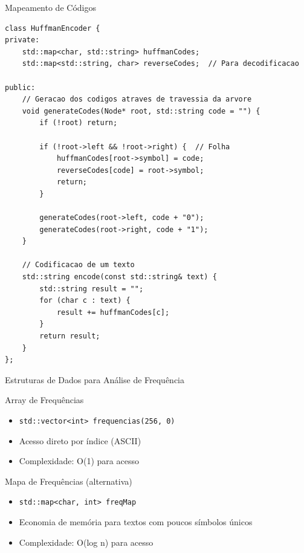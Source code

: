 \documentclass{beamer}
\begin{document}
\begin{frame}[fragile]{Mapeamento de Códigos}
    \begin{lstlisting}[style=CStyle, caption=Armazenamento dos códigos de Huffman]
class HuffmanEncoder {
private:
    std::map<char, std::string> huffmanCodes;
    std::map<std::string, char> reverseCodes;  // Para decodificacao
    
public:
    // Geracao dos codigos atraves de travessia da arvore
    void generateCodes(Node* root, std::string code = "") {
        if (!root) return;
        
        if (!root->left && !root->right) {  // Folha
            huffmanCodes[root->symbol] = code;
            reverseCodes[code] = root->symbol;
            return;
        }
        
        generateCodes(root->left, code + "0");
        generateCodes(root->right, code + "1");
    }
    
    // Codificacao de um texto
    std::string encode(const std::string& text) {
        std::string result = "";
        for (char c : text) {
            result += huffmanCodes[c];
        }
        return result;
    }
};
    \end{lstlisting}
\end{frame}

\begin{frame}{Estruturas de Dados para Análise de Frequência}
    \begin{block}{Array de Frequências}
        \begin{itemize}
            \item \texttt{std::vector<int> frequencias(256, 0)}
            \item Acesso direto por índice (ASCII)
            \item Complexidade: O(1) para acesso
        \end{itemize}
    \end{block}
    \begin{block}{Mapa de Frequências (alternativa)}
        \begin{itemize}
            \item \texttt{std::map<char, int> freqMap}
            \item Economia de memória para textos com poucos símbolos únicos
            \item Complexidade: O(log n) para acesso
        \end{itemize}
    \end{block}
\end{frame}
\end{document}
